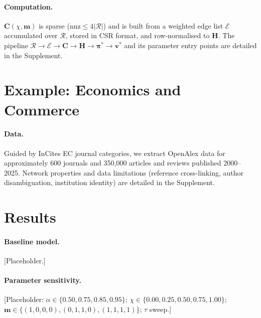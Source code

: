 \documentclass[10pt]{article}
\begin{document}
\paragraph{Computation.}

$\mathbf{C}(\chi,\mathbf{m})$ is sparse ($\mathrm{nnz}\leq
4|\mathcal{R}|$) and is built from a weighted edge list $\mathcal{E}$
accumulated over $\mathcal{R}$, stored in CSR format, and
row-normalised to $\mathbf{H}$.
The pipeline
$\mathcal{R}\!\to\!\mathcal{E}\!\to\!\mathbf{C}\!\to\!\mathbf{H}\!\to\!\boldsymbol{\pi}^*\!\to\!\mathbf{v}^*$
and its parameter entry points are detailed in the Supplement.

\section{Example: Economics and Commerce}
\label{sec:empirical}

\paragraph{Data.}
\label{sec:data}
Guided by InCites EC journal categories, we extract OpenAlex data
\citep{priemOpenAlexFullyopenIndex2022} for approximately 600 journals
and 350,000 articles and reviews published 2000--2025.
Network properties and data limitations (reference cross-linking,
author disambiguation, institution identity) are detailed in the
Supplement.

\section{Results}
\label{sec:results}

\paragraph{Baseline model.} [Placeholder.]

\paragraph{Parameter sensitivity.}
[Placeholder: $\alpha\in\{0.50,0.75,0.85,0.95\}$;
$\chi\in\{0.00,0.25,0.50,0.75,1.00\}$;
$\mathbf{m}\in\{(1,0,0,0),(0,1,1,0),(1,1,1,1)\}$; $\tau$ sweep.]
\end{document}

